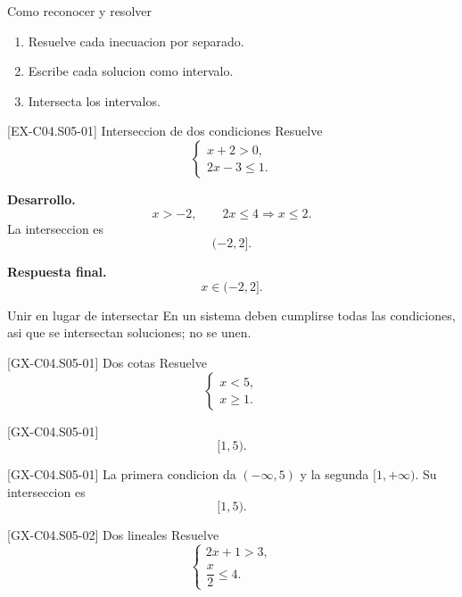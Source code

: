 \begin{methodbox}{Como reconocer y resolver}
\begin{enumerate}
  \item Resuelve cada inecuacion por separado.
  \item Escribe cada solucion como intervalo.
  \item Intersecta los intervalos.
\end{enumerate}
\end{methodbox}

\begin{solvedexample}{[EX-C04.S05-01] Interseccion de dos condiciones}
Resuelve
\[
\begin{cases}
x+2>0,\\
2x-3\leq 1.
\end{cases}
\]

\textbf{Desarrollo.}
\[
x>-2,
\qquad
2x\leq 4 \Longrightarrow x\leq 2.
\]
La interseccion es
\[
(-2,2].
\]

\textbf{Respuesta final.}
\[
x\in (-2,2].
\]
\end{solvedexample}

\begin{commonerror}{Unir en lugar de intersectar}
En un sistema deben cumplirse todas las condiciones, asi que se intersectan soluciones; no se
unen.
\end{commonerror}

\begin{guidedexercise}{[GX-C04.S05-01] Dos cotas}
Resuelve
\[
\begin{cases}
x<5,\\
x\geq 1.
\end{cases}
\]
\end{guidedexercise}

\begin{shortanswer}{[GX-C04.S05-01]}
\[
[1,5).
\]
\end{shortanswer}

\begin{fullsolution}{[GX-C04.S05-01]}
La primera condicion da \((-\infty,5)\) y la segunda \([1,+\infty)\). Su interseccion es
\[
[1,5).
\]
\end{fullsolution}

\begin{guidedexercise}{[GX-C04.S05-02] Dos lineales}
Resuelve
\[
\begin{cases}
2x+1>3,\\
\dfrac{x}{2}\leq 4.
\end{cases}
\]
\end{guidedexercise}

